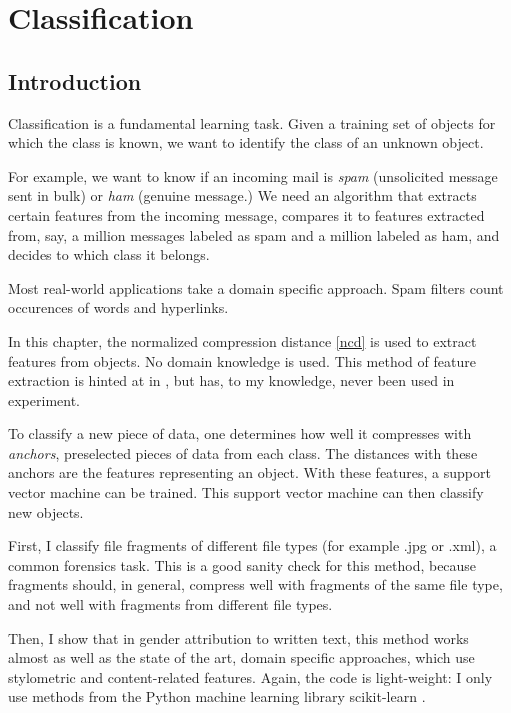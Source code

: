 
\chapter{Classification} %

\label{Chapter4} %


\section{Introduction}

Classification is a fundamental learning task. Given a training
set of objects for which the class is known, we want to identify the class
of an unknown object.

For example, we want to know if an incoming mail is \emph{spam}
(unsolicited message sent in bulk) or \emph{ham} (genuine message.) We
need an algorithm that extracts certain features from the incoming
message, compares it to features extracted from, say, a million messages
labeled as spam and a million labeled as ham, and decides to which class
it belongs.

Most real-world applications take a domain specific approach. Spam filters
count occurences of words and hyperlinks.

In this chapter, the normalized compression distance \eqref{ncd} is used
to extract features from objects. No domain knowledge is used. This method of feature extraction is hinted at in \cite{Cilibrasi2007}, but has, to my knowledge, never been used in experiment.

To classify a new piece of data, one determines how well it compresses with \emph{anchors}, preselected pieces of data from each class. The distances with these anchors are the features representing an object. With these features, a support vector machine can be trained. This support vector machine can then classify new objects.

First, I classify file fragments of different file types (for example .jpg or .xml), a common forensics task. This is a good sanity check for this method, because fragments should, in general, compress well with fragments of the same file type, and not well with fragments from different file types.

Then, I show that in gender attribution to written text, this method works almost as well as the state of the art, domain specific approaches, which use stylometric and content-related features.  Again, the code is light-weight: I only use methods from the Python machine learning library scikit-learn \cite{Pedregosa2011}.


